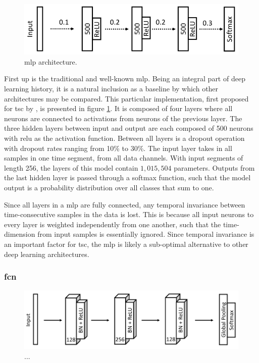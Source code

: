 \begin{figure}[h]
    \centering
    \includegraphics[width=\textwidth]{figures/impl_MLP.png}
    \caption{\acrlong{mlp} architecture. }
    \label{fig:impl_MLP}
\end{figure}

First up is the traditional and well-known \acrfull{mlp}. Being an integral part of deep learning history, it is a natural inclusion as a baseline by which other architectures may be compared. This particular implementation, first proposed for \acrshort{tsc} by \textcite{wang2016}, is presented in figure \ref{fig:impl_MLP}. It is composed of four layers where all neurons are connected to activations from neurons of the previous layer. The three hidden layers between input and output are each composed of 500 neurons with \acrshort{relu} as the activation function. Between all layers is a dropout operation with dropout rates ranging from 10\% to 30\%. The input layer takes in all samples in one time segment, from all data channels. With input segments of length 256, the layers of this model contain $1,015,504$ parameters. Outputs from the last hidden layer is passed through a softmax function, such that the model output is a probability distribution over all classes that sum to one.

Since all layers in a \acrshort{mlp} are fully connected, any temporal invariance between time-consecutive samples in the data is lost. This is because all input neurons to every layer is weighted independently from one another, such that the time-dimension from input samples is essentially ignored. Since temporal invariance is an important factor for \acrshort{tsc}, the \acrshort{mlp} is likely a sub-optimal alternative to other deep learning architectures. 

\newpage
\subsubsection{\acrlong{fcn}}

\begin{figure}[h]
    \centering
    \includegraphics[width=\textwidth]{figures/impl_FCN.png}
    \caption{...}
    \label{fig:impl_FCN}
\end{figure}

